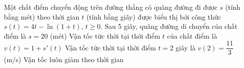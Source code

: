 \begin{ex}%
	Một chất điểm chuyển động trên đường thẳng có quãng đường đi được $s$ (tính bằng mét) theo thời gian $t$ (tính bằng giây) được biểu thị bởi công thức $s(t)=4t-\ln(1+t)$, $t\geq 0$.
	\choiceTF
	{Sau 5 giây, quãng đường di chuyển của chất điểm là $s=20$ (mét)}
	{Vận tốc tức thời tại thời điểm $t$ của chất điểm là $v(t)=1+s'(t)$}
	{\True Vận tốc tức thời tại thời điểm $t=2$ giây là $v(2)=\dfrac{11}{3}$ (m/s)}
	{Vận tốc luôn giảm theo thời gian}
\end{ex}

